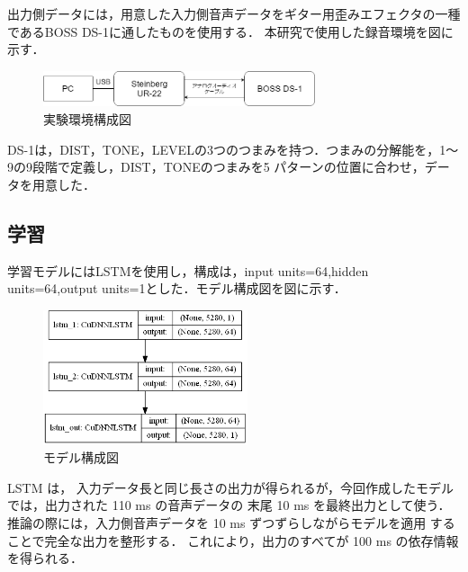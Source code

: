 \documentclass{jarticle}
\begin{document}
出力側データには，用意した入力側音声データをギター用歪みエフェクタの一種であるBOSS DS-1に通したものを使用する．
本研究で使用した録音環境を図に示す．

\begin{figure}[htbp]
 \begin{center}
  \includegraphics[width=80mm]{env.png}
 \end{center}
 \caption{実験環境構成図}
 \label{fig:one}
\end{figure}


DS-1は，DIST，TONE，LEVELの3つのつまみを持つ．つまみの分解能を，1～9の9段階で定義し，DIST，TONEのつまみを5 パターンの位置に合わせ，データを用意した．

\subsection{学習}

学習モデルにはLSTMを使用し，構成は，input units=64,hidden units=64,output units=1とした．モデル構成図を図に示す．

\begin{figure}[htbp]
 \begin{center}
  \includegraphics[width=60mm]{model.png}
 \end{center}
 \caption{モデル構成図}
 \label{fig:one}
\end{figure}

LSTM は， 入力データ長と同じ長さの出力が得られるが，今回作成したモデルでは，出力された 110 ms の音声データの 末尾 10 ms を最終出力として使う．
推論の際には，入力側音声データを 10 ms ずつずらしながらモデルを適用 することで完全な出力を整形する．
これにより，出力のすべてが 100 ms の依存情報を得られる．
\end{document}
